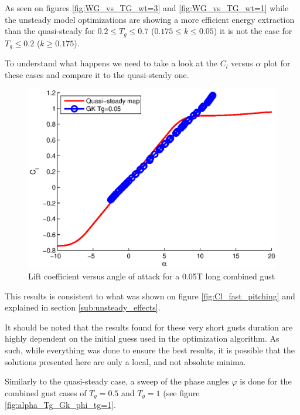 \par As seen on figures \ref{fig:WG_vs_TG_wt=3} and \ref{fig:WG_vs_TG_wt=1} while the unsteady model optimizations are showing a more efficient energy extraction than the quasi-steady for $0.2 \leq T_g \leq 0.7$ ($0.175 \leq k \leq 0.05$) it is not the case for $T_g \le 0.2$ ($k\ge 0.175$). 

To understand what happens we need to take a look at the $C_l$ versus $\alpha$ plot for these cases and compare it to the quasi-steady one.

\begin{figure}[h]
  \centering
  \includegraphics{./Figures/Cl_vs_alpha_Windtype=3_Tg=0p05_GK_alphamax=12.eps}
  \caption{Lift coefficient versus angle of attack for a 0.05T long combined gust}
  \label{fig:Cl_vs_alpha_Windtype=3_Tg=0p05_GK_alphamax=12}
\end{figure}

\FloatBarrier

\par This results is consistent to what was shown on figure \ref{fig:Cl_fast_pitching} and explained in section \ref{sub:unsteady_effects}.

\par It should be noted that the results found for these very short gusts duration are highly dependent on the initial guess used in the optimization algorithm.
As such, while everything was done to ensure the best results, it is possible that the solutions presented here are only a local, and not absolute minima.

Similarly to the quasi-steady case, a sweep of the phase angles $\varphi$ is done for the combined gust cases of $T_g=0.5$ and $T_g=1$ (see figure \ref{fig:alpha_Tg_Gk_phi_tg=1}.

